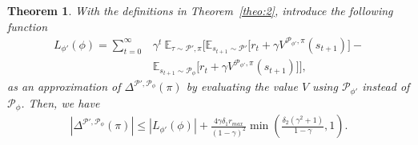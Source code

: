 \documentclass[letterpaper]{article} %
\def\E{{\mathbb{E}}}
\def\P{{\mathcal{P}}}
\newtheorem{theorem}{Theorem}%
\begin{document}
\begin{theorem}
\label{theo:3}
With the definitions in Theorem~\ref{theo:2}, introduce the following function
{\small
\begin{align}
L_{\phi'}(\phi)
=\sum_{t=0}^{\infty}&\gamma^t\
\E_{\tau \sim \P',\pi}
\bigg[
\E_{s_{t+1}\sim\P'}\big[
r_t+\gamma V^{\P_{\phi'},\pi}(s_{t+1})
\big]-
\nonumber \\
&\E_{s_{t+1}\sim\P_{\phi}}
\big[
r_t+\gamma V^{\P_{\phi'},\pi}(s_{t+1})
\big]
\bigg],
\end{align}
}as an approximation of $\Delta^{\P',\P_{\phi}}(\pi)$ by evaluating the value $V$ using $\P_{\phi'}$ instead of $\P_{\phi}$. Then, we have
{\small
\begin{equation}
\begin{aligned}
|\Delta^{\P',\P_{\phi}}(\pi)|
\leq
|L_{\phi'}(\phi)|+
\frac{4\gamma\delta_1r_{max}}{(1-\gamma)^2}
\min\left(\frac{\delta_2(\gamma^2+1)}{1-\gamma}, 1\right).
\end{aligned}
\end{equation}
}
\end{theorem}
\end{document}
